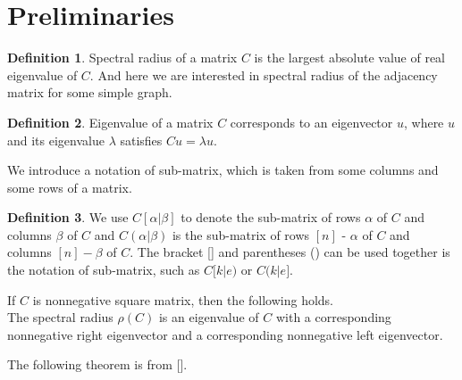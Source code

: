\documentclass{article}
\begin{document}
\theoremstyle{plain}
\newtheorem{thm}{Theorem}[section]
\newtheorem{cor}[thm]{Corollary}
\newtheorem{lem}[thm]{Lemma}
\newtheorem{prop}[thm]{Proposition}
\newtheorem{remark}[thm]{Remark}
\newtheorem{pf}[thm]{Proof}

\newtheorem{eg}[thm]{Example}
\newtheorem{conj}[thm]{Conjecture}

\theoremstyle{definition}
\newtheorem{ex}[thm]{Exercise}
\newtheorem{defn}[thm]{Definition}
\newtheorem{prob}[thm]{Problem}
\newtheorem{exam}[thm]{Example}
\newtheorem{rem}[thm]{Remark}

\newtheorem{algo}[thm]{Algorithm}




\section{Preliminaries}

\begin{defn}
Spectral radius of a matrix $C$ is the largest absolute value of real eigenvalue of $C$. And here we are interested in spectral radius of the adjacency matrix for some simple graph.
\end{defn}
\begin{defn}
    Eigenvalue of a matrix $C$ corresponds to an eigenvector $u$, where $u$ and its eigenvalue $\lambda $  satisfies $Cu = \lambda u$. 
\end{defn}
    We introduce a notation of sub-matrix, which is taken from some columns and some rows of a matrix. 
    \begin{defn}We use $C[\alpha|\beta]$ to denote the sub-matrix of rows $\alpha$ of $C$ and columns $\beta$ of $C$ and $C(\alpha|\beta)$ is the sub-matrix of rows $[n]$ - $\alpha$ of $C$ and columns $[n] - \beta$ of $C$.
    The bracket [] and parentheses () can be used together is the notation of sub-matrix, such as $C[k|e)$ or $C(k|e]$. 
\end{defn}

\thm
        If $C$ is nonnegative square matrix, then the following holds. \\
        The spectral radius $\rho(C)$ is an eigenvalue of $C$ with a corresponding nonnegative right eigenvector and a corresponding nonnegative left eigenvector.

The following theorem is from [].
\end{document}
